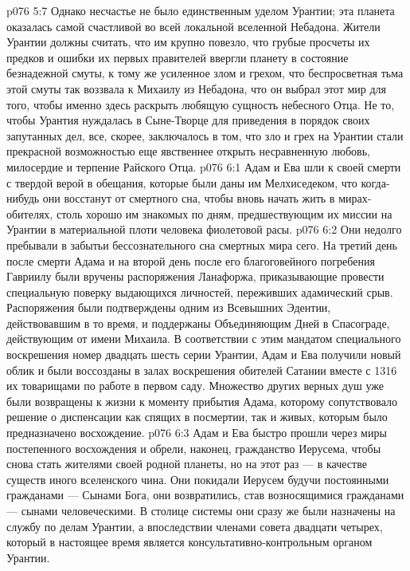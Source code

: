 \vs p076 5:7 Однако несчастье не было единственным уделом Урантии; эта планета оказалась самой счастливой во всей локальной вселенной Небадона. Жители Урантии должны считать, что им крупно повезло, что грубые просчеты их предков и ошибки их первых правителей ввергли планету в состояние безнадежной смуты, к тому же усиленное злом и грехом, что беспросветная тьма этой смуты так воззвала к Михаилу из Небадона, что он выбрал этот мир для того, чтобы именно здесь раскрыть любящую сущность небесного Отца. Не то, чтобы Урантия нуждалась в Сыне\hyp{}Творце для приведения в порядок своих запутанных дел, все, скорее, заключалось в том, что зло и грех на Урантии стали прекрасной возможностью еще явственнее открыть несравненную любовь, милосердие и терпение Райского Отца.
\vs p076 6:1 Адам и Ева шли к своей смерти с твердой верой в обещания, которые были даны им Мелхиседеком, что когда\hyp{}нибудь они восстанут от смертного сна, чтобы вновь начать жить в мирах\hyp{}обителях, столь хорошо им знакомых по дням, предшествующим их миссии на Урантии в материальной плоти человека фиолетовой расы.
\vs p076 6:2 Они недолго пребывали в забытьи бессознательного сна смертных мира сего. На третий день после смерти Адама и на второй день после его благоговейного погребения Гавриилу были вручены распоряжения Ланафоржа, приказывающие провести специальную поверку выдающихся личностей, переживших адамический срыв. Распоряжения были подтверждены одним из Всевышних Эдентии, действовавшим в то время, и поддержаны Объединяющим Дней в Спасограде, действующим от имени Михаила. В соответствии с этим мандатом специального воскрешения номер двадцать шесть серии Урантии, Адам и Ева получили новый облик и были воссозданы в залах воскрешения обителей Сатании вместе с 1316 их товарищами по работе в первом саду. Множество других верных душ уже были возвращены к жизни к моменту прибытия Адама, которому сопутствовало решение о диспенсации как спящих в посмертии, так и живых, которым было предназначено восхождение.
\vs p076 6:3 \pc Адам и Ева быстро прошли через миры постепенного восхождения и обрели, наконец, гражданство Иерусема, чтобы снова стать жителями своей родной планеты, но на этот раз --- в качестве существ иного вселенского чина. Они покидали Иерусем будучи постоянными гражданами --- Сынами Бога, они возвратились, став возносящимися гражданами --- сынами человеческими. В столице системы они сразу же были назначены на службу по делам Урантии, а впоследствии членами совета двадцати четырех, который в настоящее время является консультативно\hyp{}контрольным органом Урантии.
